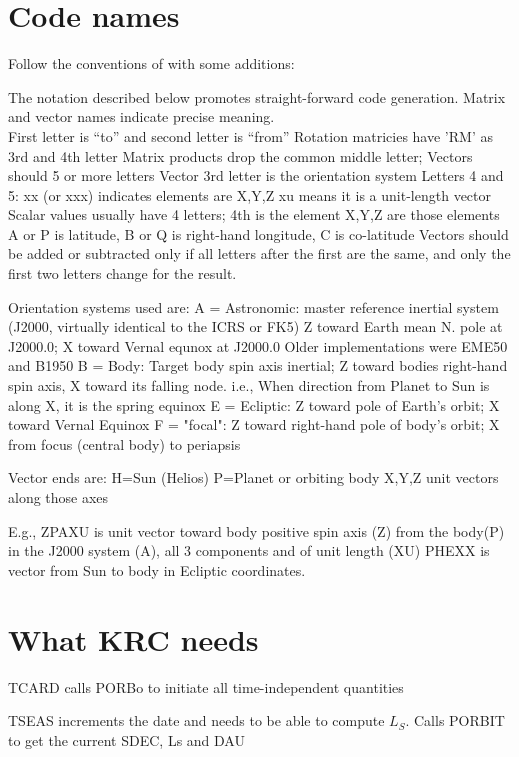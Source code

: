 \documentclass[draft]{article}
\begin{document}
\section{Code names \label{code} }
Follow the conventions of  with some additions:

The notation described below promotes straight-forward code generation.  Matrix and vector names indicate precise meaning.
\\ First letter is ``to'' and second letter is ``from''
\qi  Rotation matricies have 'RM' as 3rd and 4th letter
\qi  Matrix products drop the common middle letter;
\qi  Vectors should 5 or more letters
\qi  Vector 3rd letter is the orientation system
\qii Letters 4 and 5:
\qiii xx (or xxx) indicates elements are X,Y,Z
\qiii xu means it is a unit-length vector
\qi  Scalar values usually have 4 letters; 4th is the element
\qiii X,Y,Z are those elements 
\qiii A or P is latitude, B or Q is right-hand longitude, C is co-latitude 
\qi  Vectors should be added or subtracted only if all letters after the first
  are the same, and only the first two letters change for the result.

Orientation systems used are:
\qi A = Astronomic: master reference inertial system (J2000, virtually identical to the ICRS or FK5)
\qii Z toward Earth  mean N. pole at J2000.0; X toward Vernal equnox at J2000.0 
\qiii Older implementations were EME50 and B1950
\qi B = Body:       Target body spin axis inertial; 
\qii Z toward bodies right-hand spin axis, X toward its falling node.
\qiii i.e., When direction from Planet to Sun is along X, it is the spring equinox 
\qi E = Ecliptic:  Z toward pole of Earth's orbit;  X toward Vernal Equinox
\qi F = "focal":  Z toward right-hand pole of body's orbit;  X from focus (central body) to periapsis

Vector ends are:
\qi H=Sun (Helios) 
\qi P=Planet or orbiting body
\qi X,Y,Z unit vectors along those axes

E.g., ZPAXU is unit vector toward body positive spin axis (Z) from the body(P) in the J2000 system (A), all 3 components and of unit length (XU)
\qi PHEXX is vector from Sun to body in Ecliptic coordinates.
 
\section{What KRC needs}

TCARD calls PORBo to initiate all time-independent quantities

TSEAS increments the date and needs to be able to compute $L_S$. 
\qi Calls PORBIT to get the current  SDEC, Ls and DAU
\end{document}
